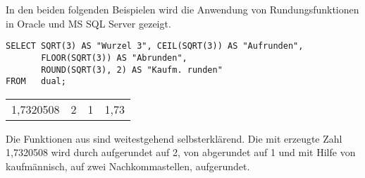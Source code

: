         In den beiden folgenden Beispielen wird die Anwendung von
        Rundungsfunktionen in Oracle und MS SQL Server gezeigt.
        \begin{lstlisting}[language=oracle_sql,caption={Rundungsfunktionen in Oracle},label=sql03_15]
SELECT SQRT(3) AS "Wurzel 3", CEIL(SQRT(3)) AS "Aufrunden",
       FLOOR(SQRT(3)) AS "Abrunden",
       ROUND(SQRT(3), 2) AS "Kaufm. runden"
FROM   dual;
        \end{lstlisting}
        \begin{center}
          \begin{small}
            \tablehead{}
            \begin{oraclesql}
              \begin{supertabular}{rrrr}
                1,7320508 & 2 & 1 & 1,73 \\
              \end{supertabular}
            \end{oraclesql}
          \end{small}
        \end{center}
        Die Funktionen aus  sind weitestgehend
        selbsterklärend. Die mit  erzeugte Zahl
        1,7320508 wird durch  aufgerundet auf 2, von
         abgerundet auf 1 und mit Hilfe von
         kaufmännisch, auf zwei Nachkommastellen,
        aufgerundet.

